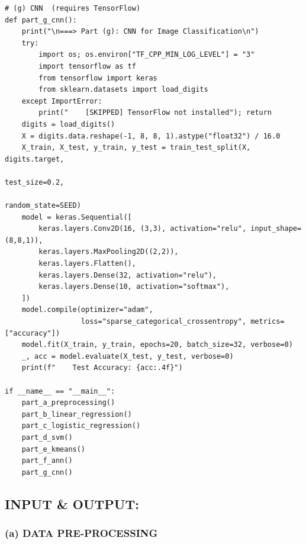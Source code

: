\documentclass[12pt,a4paper]{article}
\begin{document}
\begin{lstlisting}
# (g) CNN  (requires TensorFlow)
def part_g_cnn():
    print("\n===> Part (g): CNN for Image Classification\n")
    try:
        import os; os.environ["TF_CPP_MIN_LOG_LEVEL"] = "3"
        import tensorflow as tf
        from tensorflow import keras
        from sklearn.datasets import load_digits
    except ImportError:
        print("    [SKIPPED] TensorFlow not installed"); return
    digits = load_digits()
    X = digits.data.reshape(-1, 8, 8, 1).astype("float32") / 16.0
    X_train, X_test, y_train, y_test = train_test_split(X, digits.target,
                                                         test_size=0.2,
                                                         random_state=SEED)
    model = keras.Sequential([
        keras.layers.Conv2D(16, (3,3), activation="relu", input_shape=(8,8,1)),
        keras.layers.MaxPooling2D((2,2)),
        keras.layers.Flatten(),
        keras.layers.Dense(32, activation="relu"),
        keras.layers.Dense(10, activation="softmax"),
    ])
    model.compile(optimizer="adam",
                  loss="sparse_categorical_crossentropy", metrics=["accuracy"])
    model.fit(X_train, y_train, epochs=20, batch_size=32, verbose=0)
    _, acc = model.evaluate(X_test, y_test, verbose=0)
    print(f"    Test Accuracy: {acc:.4f}")

if __name__ == "__main__":
    part_a_preprocessing()
    part_b_linear_regression()
    part_c_logistic_regression()
    part_d_svm()
    part_e_kmeans()
    part_f_ann()
    part_g_cnn()
\end{lstlisting}

\subsection{INPUT \& OUTPUT:}

\subsubsection*{(a) DATA PRE-PROCESSING}
\end{document}
